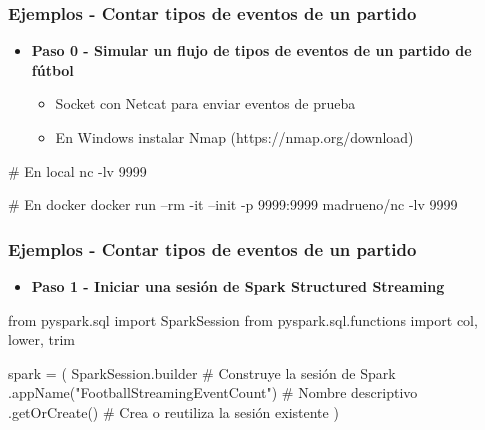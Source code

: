 \documentclass[aspectratio=169]{beamer}
\begin{document}
\begin{frame}[fragile]\frametitle{Ejemplos - Contar tipos de eventos de un partido}

\begin{itemize}
	\item \textbf{Paso 0 - Simular un flujo de tipos de eventos de un partido de fútbol}
	\begin{itemize}
		\item Socket con Netcat para enviar eventos de prueba
		\item En Windows instalar Nmap (https://nmap.org/download)
	\end{itemize}
\end{itemize}

\vspace{1em}

\begin{shellbox}
\begin{shcode}
# En local
nc -lv 9999

# En docker
docker run --rm -it --init -p 9999:9999 madrueno/nc -lv 9999
\end{shcode}
\end{shellbox}
\end{frame}

\begin{frame}[fragile]\frametitle{Ejemplos - Contar tipos de eventos de un partido}

\begin{itemize}
	\item \textbf{Paso 1 - Iniciar una sesión de Spark Structured Streaming}
\end{itemize}

\vspace{1em}

\begin{code}
\begin{python3code}
from pyspark.sql import SparkSession
from pyspark.sql.functions import col, lower, trim

spark = (
    SparkSession.builder					# Construye la sesión de Spark
    .appName("FootballStreamingEventCount") # Nombre descriptivo
    .getOrCreate()						  # Crea o reutiliza la sesión existente
)
\end{python3code}
\end{code}
\end{frame}
\end{document}
